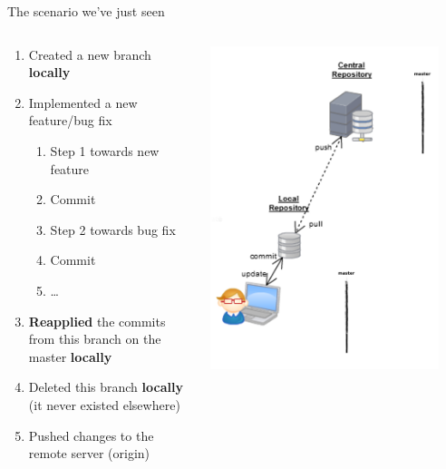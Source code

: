 \begin{frame}[fragile]{The scenario we've just seen}
    \begin{columns}
\begin{column}{0.6\textwidth}
	\tiny
	\begin{enumerate}
		\item<2> Created a new branch \textbf{locally}
		\item<3-4> Implemented a new feature/bug fix
		\begin{enumerate}
			\tiny
			\item<3> Step 1 towards new feature
			\item<3> Commit
			\item<4> Step 2 towards bug fix
			\item<4> Commit
			\item<4> \ldots
		\end{enumerate}
		\item<5> \textbf{Reapplied} the commits from this branch on the master \textbf{locally}
		\item<6> Deleted this branch \textbf{locally} (it never existed elsewhere)
		\item<7> Pushed changes to the remote server (origin)
	\end{enumerate}
\end{column}
\begin{column}{0.4\textwidth}
	\begin{center}
			 {
				\includegraphics[width=0.9\textwidth]{branch_a.png}
}
\end{center}
\end{column}
\end{columns}
\end{frame}
